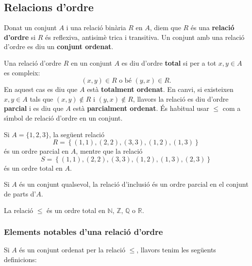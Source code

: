 \subsection{Relacions d'ordre}

Donat un conjunt $A$ i una relaci\'{o} bin\`{a}ria $R$ en $A$, diem que $R$
\'{e}s una \textbf{relaci\'{o} d'ordre} si $R$ \'{e}s reflexiva, antisim\`{e}%
trica i transitiva. Un conjunt amb una relaci\'{o} d'ordre es diu un \textbf{%
conjunt ordenat}.

Una relaci\'{o} d'ordre $R$ en un conjunt $A$ es diu d'ordre \textbf{total}
si per a tot $x,y\in A$ es compleix:%
\begin{equation*}
(x,y)\in R\text{ \ \ o b\'{e} \ \ }(y,x)\in R\text{.}
\end{equation*}
En aquest cas es diu que $A$ est\`{a} \textbf{totalment ordenat}. En canvi,
si existeixen $x,y\in A$ tals que $(x,y)\notin R$ i $(y,x)\notin R$, llavors
la relaci\'{o} es diu d'ordre \textbf{parcial} i es diu que $A$ est\`{a}
\textbf{parcialment ordenat}. \'{E}s habitual usar $\leq$ com a s\'{\i}mbol
de relaci\'{o} d'ordre en un conjunt.

\begin{exemple}
Si $A=\{1,2,3\}$, la seg\"{u}ent relaci\'{o}%
\begin{equation*}
R=\left\{ (1,1),(2,2),(3,3),(1,2),(1,3)\right\}
\end{equation*}
\'{e}s un ordre parcial en $A$, mentre que la relaci\'{o}%
\begin{equation*}
S=\left\{ (1,1),(2,2),(3,3),(1,2),(1,3),(2,3)\right\}
\end{equation*}
\'{e}s un ordre total en $A$.
\end{exemple}

\begin{exemple}
Si $A$ \'{e}s un conjunt qualsevol, la relaci\'{o} d'inclusi\'{o} \'{e}s un
ordre parcial en el conjunt de parts d'$A$.
\end{exemple}

\begin{exemple}
La relaci\'{o} $\leq$ \'{e}s un ordre total en $\mathbb{N}$, $\mathbb{Z}$, $%
\mathbb{Q}$ o $\mathbb{R}$.
\end{exemple}

\subsubsection{Elements notables d'una relaci\'{o} d'ordre}

Si $A$ \'{e}s un conjunt ordenat per la relaci\'{o} $\leq$, llavors tenim
les seg\"{u}ents definicions:

